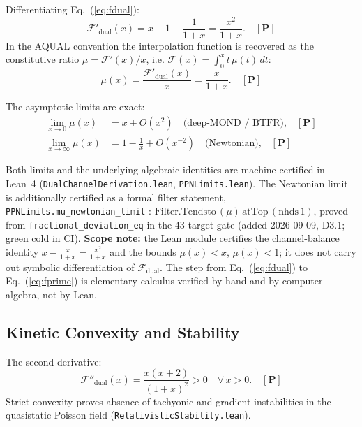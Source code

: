 \documentclass[aps,prd,preprint,superscriptaddress,nofootinbib,amsmath,amssymb,floatfix]{revtex4-2}
\begin{document}
Differentiating Eq.~(\ref{eq:fdual}):
\begin{equation}
\label{eq:fprime}
\mathcal{F}'_{\text{dual}}(x) = x - 1 + \frac{1}{1+x} = \frac{x^2}{1+x}. \quad \mathbf{[P]}
\end{equation}
In the AQUAL convention the interpolation function is recovered as the constitutive ratio $\mu = \mathcal{F}'(x)/x$, i.e. $\mathcal{F}(x) = \int_0^x t\,\mu(t)\,dt$:
\begin{equation}
\label{eq:mu_derived}
\mu(x) = \frac{\mathcal{F}'_{\text{dual}}(x)}{x} = \frac{x}{1+x}. \quad \mathbf{[P]}
\end{equation}

The asymptotic limits are exact:
\begin{align}
\lim_{x \to 0} \mu(x) &= x + O(x^2) \quad \text{(deep-MOND / BTFR),} \quad \mathbf{[P]} \\
\lim_{x \to \infty} \mu(x) &= 1 - \frac{1}{x} + O(x^{-2}) \quad \text{(Newtonian),} \quad \mathbf{[P]}
\end{align}

Both limits and the underlying algebraic identities are machine-certified in Lean~4 (\texttt{DualChannelDerivation.lean}, \texttt{PPNLimits.lean}). The Newtonian limit is additionally certified as a formal filter statement, \texttt{PPNLimits.mu\_newtonian\_limit} : $\mathrm{Filter.Tendsto}\,(\mu)\,\mathrm{atTop}\,(\mathrm{nhds}\,1)$, proved from \texttt{fractional\_deviation\_eq} in the 43-target gate (added 2026-09-09, D3.1; green cold in CI). \textbf{Scope note:} the Lean module certifies the channel-balance identity $x - \tfrac{x}{1+x} = \tfrac{x^2}{1+x}$ and the bounds $\mu(x)<x$, $\mu(x)<1$; it does not carry out symbolic differentiation of $\mathcal{F}_{\text{dual}}$. The step from Eq.~(\ref{eq:fdual}) to Eq.~(\ref{eq:fprime}) is elementary calculus verified by hand and by computer algebra, not by Lean.

\subsection{Kinetic Convexity and Stability}

The second derivative:
\begin{equation}
\mathcal{F}''_{\text{dual}}(x) = \frac{x(x+2)}{(1+x)^2} > 0 \quad \forall\, x > 0. \quad \mathbf{[P]}
\end{equation}
Strict convexity proves absence of tachyonic and gradient instabilities in the quasistatic Poisson field (\texttt{RelativisticStability.lean}).
\end{document}
